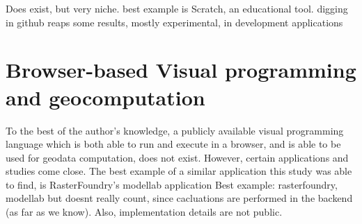 Does exist, but very niche. 
best example is Scratch, an educational tool.
digging in github reaps some results, mostly experimental, in development applications

\section{Browser-based Visual programming and geocomputation} 

To the best of the author's knowledge, a publicly available visual programming language which is both able to run and execute in a browser, and is able to be used for geodata computation, does not exist. 
However, certain applications and studies come close. 
The best example of a similar application this study was able to find, is RasterFoundry's modellab application
Best example: rasterfoundry, modellab but doesnt really count, since cacluations are performed in the backend (as far as we know). 
Also, implementation details are not public. 



